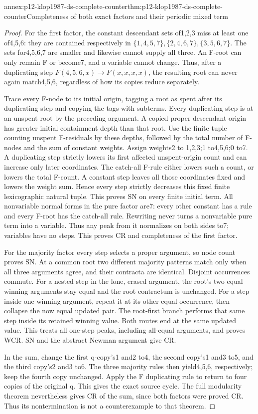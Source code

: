 \begin{annexitem}{annex:p12-klop1987-ds-complete-counter}{thm:p12-klop1987-ds-complete-counter}{Completeness of both exact factors and their periodic mixed term}
\begin{proof}
For the first factor, the constant descendant sets of1,2,3 miss
at least one of4,5,6: they are contained respectively in
\(\{1,4,5,7\},\{2,4,6,7\},\{3,5,6,7\}\).
The sets for4,5,6,7 are smaller and likewise cannot supply all
three. An F-root can only remain F or become7, and a variable
cannot change. Thus, after a duplicating step
\(F(4,5,6,x)\to F(x,x,x,x)\), the resulting root can never
again match4,5,6, regardless of how its copies reduce separately.

Trace every F-node to its initial origin, tagging a root as
spent after its duplicating step and copying the tags with subterms.
Every duplicating step is at an unspent root by the preceding
argument. A copied proper descendant origin has greater initial
containment depth than that root. Use the finite tuple counting
unspent F-residuals by these depths, followed by the total number
of F-nodes and the sum of constant weights. Assign weights2 to
1,2,3;1 to4,5,6;0 to7. A duplicating step strictly lowers its
first affected unspent-origin count and can increase only later
coordinates. The catch-all F-rule either lowers such a count,
or lowers the total F-count. A constant step leaves all those
coordinates fixed and lowers the weight sum. Hence every step
strictly decreases this fixed finite lexicographic natural tuple.
This proves SN on every finite initial term. All nonvariable
normal forms in the pure factor are7: every other constant has
a rule and every F-root has the catch-all rule. Rewriting never
turns a nonvariable pure term into a variable. Thus any peak
from it normalizes on both sides to7; variables have no steps.
This proves CR and completeness of the first factor.

For the majority factor every step selects a proper argument,
so node count proves SN. At a common root two different majority
patterns match only when all three arguments agree, and their
contracta are identical. Disjoint occurrences commute. For a
nested step in the lone, erased argument, the root's two equal
winning arguments stay equal and the root contractum is unchanged.
For a step inside one winning argument, repeat it at its other
equal occurrence, then collapse the now equal updated pair.
The root-first branch performs that same step inside its retained
winning value. Both routes end at the same updated value.
This treats all one-step peaks, including all-equal arguments,
and proves WCR. SN and the abstract Newman argument give CR.

In the sum, change the first q-copy's1 and2 to4, the second
copy's1 and3 to5, and the third copy's2 and3 to6. The three
majority rules then yield4,5,6, respectively; keep the fourth
copy unchanged. Apply the F duplicating rule to return to four
copies of the original q. This gives the exact source cycle.
The full modularity theorem nevertheless gives CR of the sum,
since both factors were proved CR. Thus its nontermination is
not a counterexample to that theorem.
\end{proof}
\end{annexitem}

